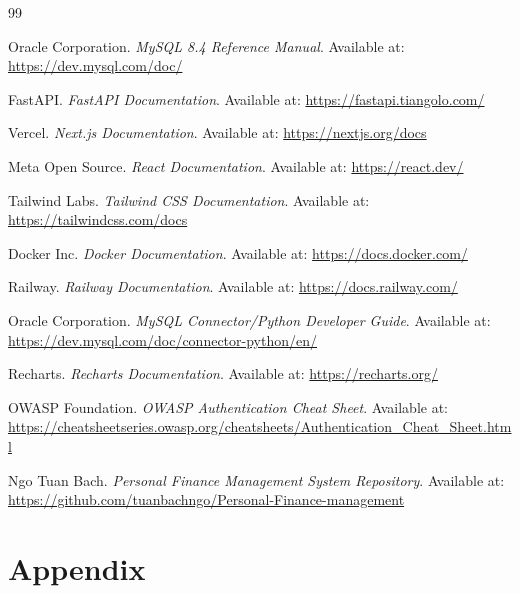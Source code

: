 \documentclass{article}
\newcommand{\repoURL}{https://github.com/tuanbachngo/Personal-Finance-management}
\begin{document}
\begin{thebibliography}{99}

Oracle Corporation.
\newblock \textit{MySQL 8.4 Reference Manual}.
\newblock Available at: \url{https://dev.mysql.com/doc/}

FastAPI.
\newblock \textit{FastAPI Documentation}.
\newblock Available at: \url{https://fastapi.tiangolo.com/}

Vercel.
\newblock \textit{Next.js Documentation}.
\newblock Available at: \url{https://nextjs.org/docs}

Meta Open Source.
\newblock \textit{React Documentation}.
\newblock Available at: \url{https://react.dev/}

Tailwind Labs.
\newblock \textit{Tailwind CSS Documentation}.
\newblock Available at: \url{https://tailwindcss.com/docs}

Docker Inc.
\newblock \textit{Docker Documentation}.
\newblock Available at: \url{https://docs.docker.com/}

Railway.
\newblock \textit{Railway Documentation}.
\newblock Available at: \url{https://docs.railway.com/}

Oracle Corporation.
\newblock \textit{MySQL Connector/Python Developer Guide}.
\newblock Available at: \url{https://dev.mysql.com/doc/connector-python/en/}

Recharts.
\newblock \textit{Recharts Documentation}.
\newblock Available at: \url{https://recharts.org/}

OWASP Foundation.
\newblock \textit{OWASP Authentication Cheat Sheet}.
\newblock Available at: \url{https://cheatsheetseries.owasp.org/cheatsheets/Authentication_Cheat_Sheet.html}

Ngo Tuan Bach.
\newblock \textit{Personal Finance Management System Repository}.
\newblock Available at: \url{\repoURL}

\end{thebibliography}
\newpage
\clearpage
\appendix

\section*{Appendix}
\end{document}
